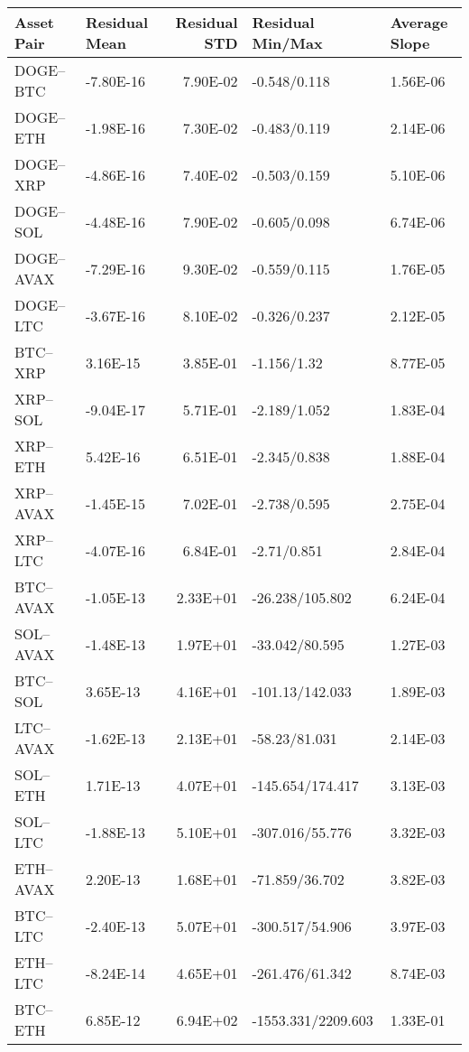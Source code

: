 \begin{tabular}{llrll}
\toprule
Asset Pair & Residual Mean & Residual STD & Residual Min/Max & Average Slope \\
\midrule
DOGE–BTC & -7.80E-16 & 7.90E-02 & -0.548/0.118 & 1.56E-06 \\
DOGE–ETH & -1.98E-16 & 7.30E-02 & -0.483/0.119 & 2.14E-06 \\
DOGE–XRP & -4.86E-16 & 7.40E-02 & -0.503/0.159 & 5.10E-06 \\
DOGE–SOL & -4.48E-16 & 7.90E-02 & -0.605/0.098 & 6.74E-06 \\
DOGE–AVAX & -7.29E-16 & 9.30E-02 & -0.559/0.115 & 1.76E-05 \\
DOGE–LTC & -3.67E-16 & 8.10E-02 & -0.326/0.237 & 2.12E-05 \\
BTC–XRP & 3.16E-15 & 3.85E-01 & -1.156/1.32 & 8.77E-05 \\
XRP–SOL & -9.04E-17 & 5.71E-01 & -2.189/1.052 & 1.83E-04 \\
XRP–ETH & 5.42E-16 & 6.51E-01 & -2.345/0.838 & 1.88E-04 \\
XRP–AVAX & -1.45E-15 & 7.02E-01 & -2.738/0.595 & 2.75E-04 \\
XRP–LTC & -4.07E-16 & 6.84E-01 & -2.71/0.851 & 2.84E-04 \\
BTC–AVAX & -1.05E-13 & 2.33E+01 & -26.238/105.802 & 6.24E-04 \\
SOL–AVAX & -1.48E-13 & 1.97E+01 & -33.042/80.595 & 1.27E-03 \\
BTC–SOL & 3.65E-13 & 4.16E+01 & -101.13/142.033 & 1.89E-03 \\
LTC–AVAX & -1.62E-13 & 2.13E+01 & -58.23/81.031 & 2.14E-03 \\
SOL–ETH & 1.71E-13 & 4.07E+01 & -145.654/174.417 & 3.13E-03 \\
SOL–LTC & -1.88E-13 & 5.10E+01 & -307.016/55.776 & 3.32E-03 \\
ETH–AVAX & 2.20E-13 & 1.68E+01 & -71.859/36.702 & 3.82E-03 \\
BTC–LTC & -2.40E-13 & 5.07E+01 & -300.517/54.906 & 3.97E-03 \\
ETH–LTC & -8.24E-14 & 4.65E+01 & -261.476/61.342 & 8.74E-03 \\
BTC–ETH & 6.85E-12 & 6.94E+02 & -1553.331/2209.603 & 1.33E-01 \\
\bottomrule
\end{tabular}
